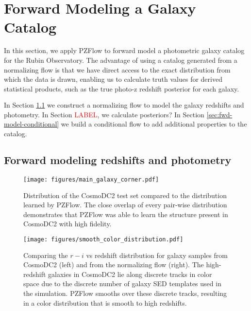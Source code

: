 \documentclass[twocolumn]{aastex631}
\newcommand{\note}[1]{\textsf{\textcolor{red}{#1}}}
\begin{document}
\section{Forward Modeling a Galaxy Catalog}
\label{sec:galaxy-catalog}

In this section, we apply PZFlow to forward model a photometric galaxy catalog for the Rubin Observatory.
The advantage of using a catalog generated from a normalizing flow is that we have direct access to the exact distribution from which the data is drawn, enabling us to calculate truth values for derived statistical products, such as the true photo-z redshift posterior for each galaxy.

In Section \ref{sec:fwd-model} we construct a normalizing flow to model the galaxy redshifts and photometry.
In Section \note{LABEL}, we calculate posteriors?
In Section \ref{sec:fwd-model-conditional} we build a conditional flow to add additional properties to the catalog.

\subsection{Forward modeling redshifts and photometry}
\label{sec:fwd-model}

\begin{figure*}[t!]
    \begin{centering}
        \texttt{[image: figures/main\_galaxy\_corner.pdf]}
        \caption{
            Distribution of the CosmoDC2 test set compared to the distribution learned by PZFlow.
            The close overlap of every pair-wise distribution demonstrates that PZFlow was able to learn the structure present in CosmoDC2 with high fidelity.
        }
        \label{fig:main-corner}
    \end{centering}
\end{figure*}

\begin{figure*}[t!]
    \begin{centering}
        \texttt{[image: figures/smooth\_color\_distribution.pdf]}
        \caption{
            Comparing the $r-i$ vs redshift distribution for galaxy samples from CosmoDC2 (left) and from the normalizing flow (right).
            The high-redshift galaxies in CosmoDC2 lie along discrete tracks in color space due to the discrete number of galaxy SED templates used in the simulation.
            PZFlow smooths over these discrete tracks, resulting in a color distribution that is smooth to high redshifts.
        }
        \label{fig:smooth-color-dist}
    \end{centering}
\end{figure*}
\end{document}
